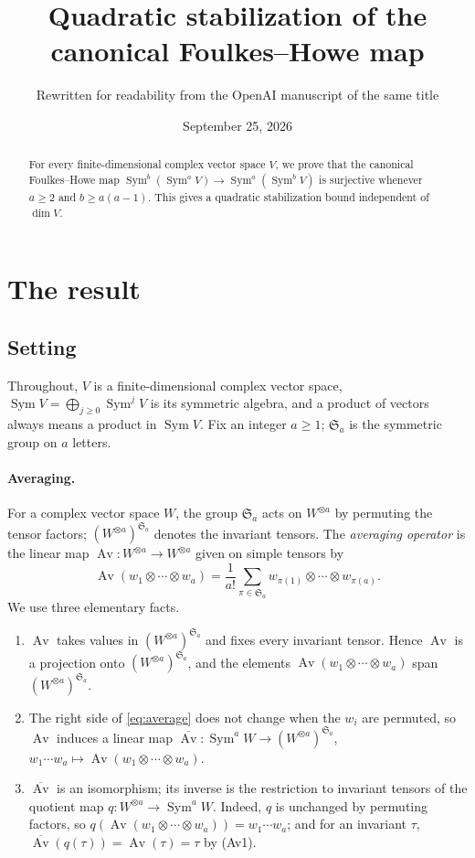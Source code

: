 \documentclass[11pt]{article}
\title{Quadratic stabilization of the canonical Foulkes--Howe map}
\author{Rewritten for readability from the OpenAI manuscript of the same title}
\date{September 25, 2026}
\theoremstyle{remark}
\DeclareMathOperator{\Sym}{Sym}
\DeclareMathOperator{\Av}{Av}
\newcommand{\Sa}{\mathfrak S_a}
\begin{document}
\maketitle
\begin{abstract}
For every finite-dimensional complex vector space $V$, we prove that the
canonical Foulkes--Howe map
$\Sym^b(\Sym^a V)\longrightarrow\Sym^a(\Sym^b V)$ is surjective whenever
$a\ge2$ and $b\ge a(a-1)$. This gives a quadratic stabilization bound
independent of $\dim V$.
\end{abstract}

\section{The result}\label{sec:result}

\subsection{Setting}

Throughout, $V$ is a finite-dimensional complex vector space,
$\Sym V=\bigoplus_{j\ge0}\Sym^jV$ is its symmetric algebra, and a product
of vectors always means a product in $\Sym V$. Fix an integer $a\ge1$;
$\Sa$ is the symmetric group on $a$ letters.

\paragraph{Averaging.}
For a complex vector space $W$, the group $\Sa$ acts on $W^{\otimes a}$ by
permuting the tensor factors; $(W^{\otimes a})^{\Sa}$ denotes the invariant
tensors. The \emph{averaging operator} is the linear map
$\Av\colon W^{\otimes a}\to W^{\otimes a}$ given on simple tensors by
\begin{equation}\label{eq:average}
 \Av(w_1\otimes\cdots\otimes w_a)
 =\frac1{a!}\sum_{\pi\in\Sa}
 w_{\pi(1)}\otimes\cdots\otimes w_{\pi(a)}.
\end{equation}
We use three elementary facts.
\begin{enumerate}[label=(Av\arabic*),leftmargin=3.2em]
\item $\Av$ takes values in $(W^{\otimes a})^{\Sa}$ and fixes every
invariant tensor. Hence $\Av$ is a projection onto $(W^{\otimes a})^{\Sa}$,
and the elements $\Av(w_1\otimes\cdots\otimes w_a)$ span
$(W^{\otimes a})^{\Sa}$.
\item The right side of \eqref{eq:average} does not change when the $w_i$
are permuted, so $\Av$ induces a linear map
$\overline{\Av}\colon\Sym^aW\to(W^{\otimes a})^{\Sa}$,
$w_1\cdots w_a\mapsto\Av(w_1\otimes\cdots\otimes w_a)$.
\item $\overline{\Av}$ is an isomorphism; its inverse is the restriction to
invariant tensors of the quotient map $q\colon W^{\otimes a}\to\Sym^aW$.
Indeed, $q$ is unchanged by permuting factors, so
$q(\Av(w_1\otimes\cdots\otimes w_a))=w_1\cdots w_a$; and for an invariant
$\tau$, $\overline{\Av}(q(\tau))=\Av(\tau)=\tau$ by (Av1).
\end{enumerate}
\end{document}
